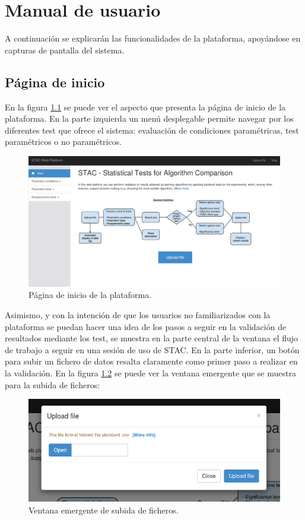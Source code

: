 \chapter{Manual de usuario}

A continuación se explicarán las funcionalidades de la plataforma, apoyándose en capturas de pantalla del sistema.

\section{Página de inicio}

En la figura \ref{fig:man_inicio} se puede ver el aspecto que presenta la página de inicio de la plataforma. En la parte izquierda un menú desplegable permite navegar por los diferentes test que ofrece el sistema: evaluación de condiciones paramétricas, test paramétricos o no paramétricos.

\begin{figure}[H]
\centering
\includegraphics[scale=0.4]{figuras/man_inicio.png}
\caption{Página de inicio de la plataforma.}
\label{fig:man_inicio}
\end{figure}

Asimismo, y con la intención de que los usuarios no familiarizados con la plataforma se puedan hacer una idea de los pasos a seguir en la validación de resultados mediante los test, se muestra en la parte central de la ventana el flujo de trabajo a seguir en una sesión de uso de STAC. En la parte inferior, un botón para subir un fichero de datos resalta claramente como primer paso a realizar en la validación. En la figura \ref{fig:man_fichero} se puede ver la ventana emergente que se muestra para la subida de ficheros:

\begin{figure}[H]
\centering
\includegraphics[scale=0.5]{figuras/man_fichero.png}
\caption{Ventana emergente de subida de ficheros.}
\label{fig:man_fichero}
\end{figure}

